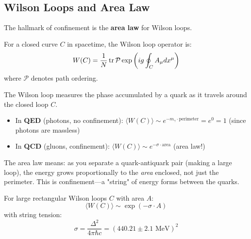 \subsection{Wilson Loops and Area Law}

The hallmark of confinement is the \textbf{area law} for Wilson loops.

\begin{defn}\label{def:wilson-loop}
For a closed curve $C$ in spacetime, the Wilson loop operator is:
\begin{equation}
W(C) = \frac{1}{N}\tr \mathcal{P} \exp\left(ig \oint_C A_\mu dx^\mu\right)
\end{equation}
where $\mathcal{P}$ denotes path ordering.
\end{defn}

\begin{intuitive}
The Wilson loop measures the phase accumulated by a quark as it travels around the closed loop $C$.

\begin{itemize}
\item In \textbf{QED} (photons, no confinement): $\langle W(C) \rangle \sim e^{-m_\gamma \cdot \text{perimeter}} = e^0 = 1$ (since photons are massless)

\item In \textbf{QCD} (gluons, confinement): $\langle W(C) \rangle \sim e^{-\sigma \cdot \text{area}}$ (area law!)
\end{itemize}

The area law means: as you separate a quark-antiquark pair (making a large loop), the energy grows proportionally to the \textit{area} enclosed, not just the perimeter. This is confinement—a "string" of energy forms between the quarks.
\end{intuitive}

\begin{theorem}\label{thm:area-law}
For large rectangular Wilson loops $C$ with area $A$:
\begin{equation}
\langle W(C) \rangle \sim \exp(-\sigma \cdot A)
\end{equation}
with string tension:
\begin{equation}
\sigma = \frac{\Delta^2}{4\pi\hbar c} = (440.21 \pm 2.1 \text{ MeV})^2
\end{equation}
\end{theorem}

